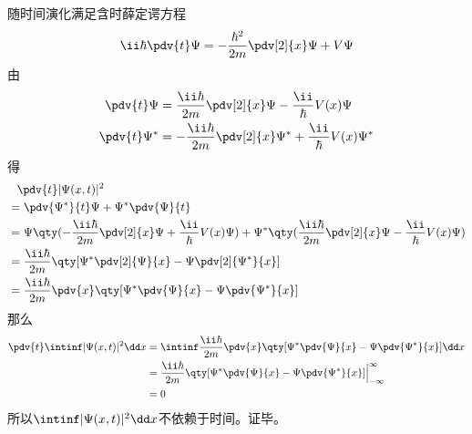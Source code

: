{    	随时间演化满足含时薛定谔方程
    	\begin{equation}
    	\ii\hbar \pdv{t} \Psi = -\frac{\hbar^2}{2m} \pdv[2]{x}\Psi + V\Psi
    	\end{equation}
由
    \begin{align}
    \pdv{t} \Psi &= \dfrac{\ii\hbar}{2m} \pdv[2]{x} \Psi - \dfrac{\ii}{\hbar} V(x) \Psi \\
    \pdv{t} \Psi^* &= -\dfrac{\ii\hbar}{2m} \pdv[2]{x} \Psi^* + \dfrac{\ii}{\hbar} V(x) \Psi^*
    \end{align}
得
    	\begin{align}
    	&\phantom{=}\pdv{t} |\Psi(x,t)|^2  \\
        &= \pdv{\Psi^*}{t}\Psi + \Psi^*\pdv{\Psi}{t}  \\
    	&= \Psi \qty(-\dfrac{\ii\hbar}{2m} \pdv[2]{x} \Psi + \dfrac{\ii}{\hbar} V(x) \Psi) + \Psi^* \qty(\dfrac{\ii\hbar}{2m} \pdv[2]{x} \Psi - \dfrac{\ii}{\hbar} V(x) \Psi) \\
    	&= \dfrac{\ii\hbar}{2m} \qty[\Psi^*\pdv[2]{\Psi}{x} - \Psi\pdv[2]{\Psi^*}{x}] \\
    	&= \dfrac{\ii\hbar}{2m} \pdv{x} \qty[\Psi^*\pdv{\Psi}{x} - \Psi\pdv{\Psi^*}{x}]
    	\end{align}
那么
    \begin{align}
    \pdv{t} \intinf |\Psi(x,t)|^2 \dd x &= \intinf \dfrac{\ii\hbar}{2m} \pdv{x} \qty[\Psi^*\pdv{\Psi}{x} - \Psi\pdv{\Psi^*}{x}] \dd x \\
    & = \dfrac{\ii\hbar}{2m} \qty[\Psi^*\pdv{\Psi}{x} - \Psi\pdv{\Psi^*}{x}] \Big|_{-\infty}^\infty \\
   &= 0 
    \end{align}
 所以$ \intinf |\Psi(x,t)|^2 \dd x  $不依赖于时间。证毕。
}




